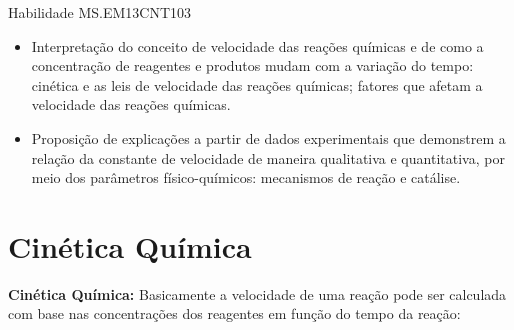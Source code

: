 \documentclass[10pt]{scrartcl}
\author{fabio}
\date{\today}
\title{}
\def\disciplina{Química}
\begin{document}
\twocolumn[
%

%
%



%

\smallbreak
\medbreak
\par\vspace{2ex}]%


\begin{bclogo}[logo=\bcattention, noborder=true, barre=none]{Habilidade MS.EM13CNT103 }
\begin{itemize}
\item Interpretação do conceito de velocidade das reações químicas e de como a concentração de reagentes e produtos mudam com a variação do tempo: cinética e as leis de velocidade das reações químicas; fatores que afetam a velocidade das reações químicas.
\item Proposição de explicações a partir de dados experimentais que demonstrem a relação da constante de velocidade de maneira qualitativa e quantitativa, por meio dos parâmetros físico-químicos: mecanismos de reação e catálise.
\end{itemize}
\end{bclogo}
\section{Cinética Química}
\label{sec:orgd0417d7}
\textbf{Cinética Química:} Basicamente a velocidade de uma reação pode ser calculada com base nas concentrações dos reagentes em função do tempo da reação: 
\end{document}
